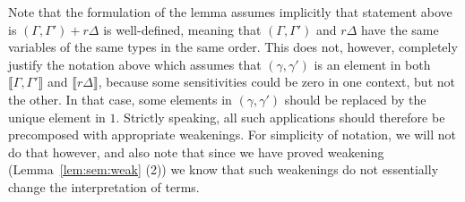\documentclass[a4paper,UKenglish,cleveref, autoref, thm-restate]{lipics-v2021}
\newcommand{\den}[1]{\llbracket #1\rrbracket}
\begin{document}
Note that the formulation of the lemma assumes implicitly that  statement above is $(\Gamma,\Gamma')+r\Delta$ is well-defined, meaning that $(\Gamma,\Gamma')$ 
and $r\Delta$ have the same variables of the same types in the same order. This does not, however, completely justify the notation above which 
assumes that  $(\gamma,\gamma')$ is an element in both $\den{\Gamma,\Gamma'}$ and $\den{r\Delta}$, because some sensitivities could be zero in one context, but not the other.
In that case, some elements in $(\gamma, \gamma')$ should be replaced by the unique element in $1$. %
Strictly speaking, all such applications should therefore be precomposed with appropriate weakenings. For simplicity of notation, we will not do that however,
and also note that since we have proved weakening (Lemma~\ref{lem:sem:weak} (2)) we know that such weakenings do not essentially change the interpretation of terms. 
\end{document}
